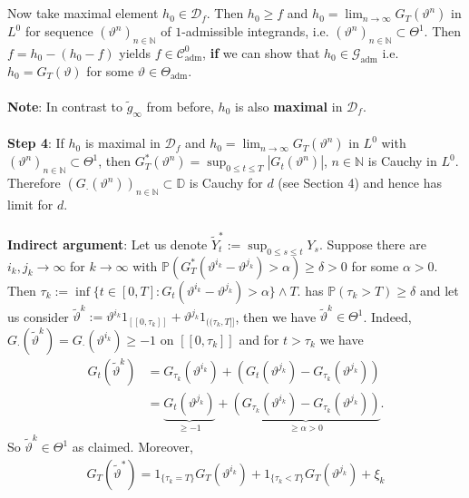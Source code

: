 \documentclass[12pt,a4paper, twoside]{article}
\theoremstyle{definition}
\newcommand{\PP}{\mathbb{P}} %
\begin{document}
\\\\
Now take maximal element $h_0 \in \mathcal{D}_f$. Then $h_0 \geq f$ and $h_0 = \lim_{n \to \infty} G_T( \vartheta^n)$ in $L^0$ for sequence $( \vartheta^n)_{n \in \mathbb{N}}$ of $1$-admissible integrands, i.e. $( \vartheta^n)_{n \in \mathbb{N}} \subset \Theta^1$. Then $f=h_0-(h_0-f)$ yields $f \in \mathcal{C}_\text{adm}^0$, \textbf{if} we can show that $h_0 \in \mathcal{G}_\text{adm}$ i.e. $h_0  = G_T( \vartheta)$ for some $\vartheta \in \Theta_\text{adm}$.
\\\\
\textbf{Note}: In contrast to $\widetilde{g}_\infty$ from before, $h_0$ is also \textbf{maximal} in $\mathcal{D}_f$. \\
\\
\textbf{Step 4}: If $h_0$ is maximal in $\mathcal{D}_f$ and $h_0 = \lim_{n \to \infty} G_T( \vartheta^n)$ in $L^0$ with $( \vartheta^n)_{n \in \mathbb{N}} \subset \Theta^1$, then $G_T^*( \vartheta^n) = \sup_{0 \leq t \leq T} | G_t( \vartheta^n)|$, $n \in \mathbb{N}$ is Cauchy in $L^0$. Therefore $( G_\cdot ( \vartheta^n))_{n \in \mathbb{N}} \subset \mathbb{D}$ is Cauchy for $d$ (see Section 4) and hence has limit for $d$. \\
\\
\textbf{Indirect argument}: Let us denote $\widetilde{Y}_t^*:= \sup_{0 \leq s \leq t} Y_s$. Suppose there are $i_k, j_k \to \infty$ for $k \to \infty$ with $\PP(G_T^*( \vartheta^{i_k}- \vartheta^{j_k}) > \alpha) \geq \delta >0$ for some $\alpha >0$. Then $\tau_k := \inf \{ t \in [0,T] : G_t( \vartheta^{i_k}- \vartheta^{j_k}) > \alpha  \} \wedge T$. has $\PP( \tau_k > T) \geq \delta$ and let us consider  $\widetilde{\vartheta}^k:= \vartheta^{i_k} 1_{[ \![ 0, \tau_k ]\!]} + \vartheta^{j_k} 1_{(\!( \tau_k, T]\!]}$, then we have $\widetilde{\vartheta}^k \in \Theta^1$. Indeed, $G_\cdot ( \widetilde{\vartheta}^k) = G_\cdot ( \vartheta^{i_k}) \geq -1$ on $[\![0, \tau_k ]\!]$ and for $t > \tau_k$ we have  
\begin{align*}
G_t( \widetilde{\vartheta}^k) &= G_{\tau_k} ( \vartheta^{i_k}) + ( G_t( \vartheta^{j_k}) - G_{\tau_k} ( \vartheta^{j_k})) \\
&= \underbrace{G_t( \vartheta^{j_k})}_{ \geq -1} + \underbrace{( G_{\tau_k} ( \vartheta^{i_k})- G_{\tau_k} ( \vartheta^{j_k}))}_{ \geq \alpha >0}.
\end{align*}
So $\widetilde{\vartheta}^k \in \Theta^1$ as claimed.
\newpage Moreover, 
\begin{align*}
G_T( \widetilde{\vartheta}^*) = 1_{\{ \tau_k = T\}} G_T( \vartheta^{i_k}) + 1_{\{ \tau_k < T\}} G_T( \vartheta^{j_k}) + \xi_k
\end{align*}
\end{document}
